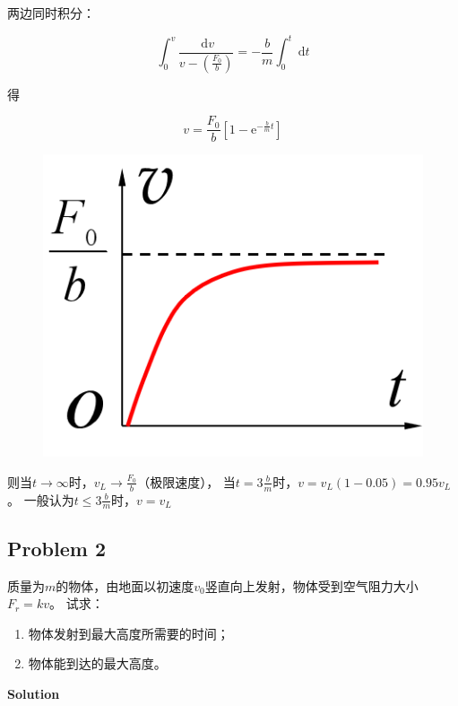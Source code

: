 \documentclass[12pt, a4paper]{article}
\numberwithin{equation}{section}
\newcommand{\rmd}{\mathrm{~d}}
\begin{document}
    两边同时积分：

    $$
        \int_0^v \frac{\rmd v}{v-\left(\frac{F_0}{b}\right)}=-\frac{b}{m} \int_0^t \rmd t
    $$

    得

    $$
        v=\frac{F_0}{b}\left[1-\mathrm{e}^{-\frac{b}{m} t}\right]
    $$

    \begin{figure}
        \centering
        \includegraphics[scale=0.3]{"Chapter 02 images/pic3.png"}
        \label{pic3}
    \end{figure}

    则当\(t \rightarrow \infty\)时，\(v_{L} \rightarrow \frac{F_{0}}{b}\)（极限速度），
    当\(t = 3 \frac{b}{m}\)时，\(v = v_{L}\left(1-0.05\right) = 0.95 v_{L}\)。
    一般认为\(t \leq 3 \frac{b}{m}\)时，\(v = v_{L}\)

\subsection{Problem 2}

    质量为\(m\)的物体，由地面以初速度\(v_{0}\)竖直向上发射，物体受到空气阻力大小\(F_{r} = kv\)。
    试求：

    \begin{enumerate}
        \item 物体发射到最大高度所需要的时间；
        \item 物体能到达的最大高度。
    \end{enumerate}

    \textbf{Solution}
    \\
\end{document}
